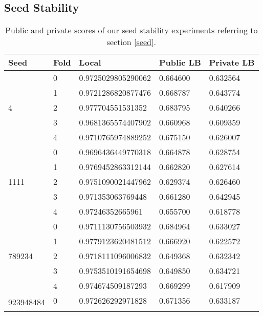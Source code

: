 \subsection{Seed Stability}
\begin{table}[h!]
\caption{Public and private scores of our seed stability experiments referring to section \ref{seed}.}
\begin{tabular}{|l|l|l|l|l|}
\hline
Seed                       & Fold & Local              & Public LB & Private LB \\ \hline
\multirow{5}{*}{4}         & 0    & 0.9725029805290062 & 0.664600  & 0.632564   \\ \cline{2-5} 
                           & 1    & 0.9721286820877476 & 0.668787  & 0.643774   \\ \cline{2-5} 
                           & 2    & 0.977704551531352  & 0.683795  & 0.640266   \\ \cline{2-5} 
                           & 3    & 0.9681365574407902 & 0.660968  & 0.609359   \\ \cline{2-5} 
                           & 4    & 0.9710765974889252 & 0.675150  & 0.626007   \\ \hline
\multirow{5}{*}{1111}      & 0    & 0.9696436449770318 & 0.664878  & 0.628754   \\ \cline{2-5} 
                           & 1    & 0.9769452863312144 & 0.662820  & 0.627614   \\ \cline{2-5} 
                           & 2    & 0.9751090021447962 & 0.629374  & 0.626460   \\ \cline{2-5} 
                           & 3    & 0.971353063769448  & 0.661280  & 0.642945   \\ \cline{2-5} 
                           & 4    & 0.97246352665961   & 0.655700  & 0.618778   \\ \hline
\multirow{5}{*}{789234}    & 0    & 0.9711130756503932 & 0.684964  & 0.633027   \\ \cline{2-5} 
                           & 1    & 0.9779123620481512 & 0.666920  & 0.622572   \\ \cline{2-5} 
                           & 2    & 0.9718111096006832 & 0.649368  & 0.632342   \\ \cline{2-5} 
                           & 3    & 0.9753510191654698 & 0.649850  & 0.634721   \\ \cline{2-5} 
                           & 4    & 0.974674509187293  & 0.669299  & 0.617909   \\ \hline
\multirow{5}{*}{923948484} & 0    & 0.972626292971828  & 0.671356  & 0.633187   \\ \cline{2-5} 

\end{tabular}
\end{table}
